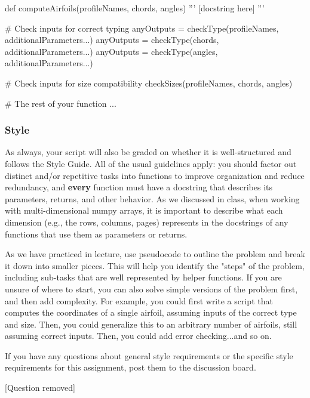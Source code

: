 \documentclass{homework}
\begin{document}
\begin{python}
def computeAirfoils(profileNames, chords, angles)
    '''
    [docstring here]
    '''

    # Check inputs for correct typing
    anyOutputs = checkType(profileNames, additionalParameters...)
    anyOutputs = checkType(chords, additionalParameters...)
    anyOutputs = checkType(angles, additionalParameters...)

    # Check inputs for size compatibility
    checkSizes(profileNames, chords, angles)

    # The rest of your function
    ...
\end{python}

\subsubsection*{Style}

As always, your script will also be graded on whether it is well-structured and follows the Style Guide. All of the usual guidelines apply: you should factor out distinct and/or repetitive tasks into functions to improve organization and reduce redundancy, and \textbf{every} function must have a docstring that describes its parameters, returns, and other behavior. As we discussed in class, when working with multi-dimensional numpy arrays, it is important to describe what each dimension (e.g., the rows, columns, pages) represents in the docstrings of any functions that use them as parameters or returns.

As we have practiced in lecture, use pseudocode to outline the problem and break it down into smaller pieces. This will help you identify the "steps" of the problem, including sub-tasks that are well represented by helper functions. If you are unsure of where to start, you can also solve simple versions of the problem first, and then add complexity. For example, you could first write a script that computes the coordinates of a single airfoil, assuming inputs of the correct type and size. Then, you could generalize this to an arbitrary number of airfoils, still assuming correct inputs. Then, you could add error checking...and so on.

If you have any questions about general style requirements or the specific style requirements for this assignment, post them to the discussion board.

\newpage
{}

[Question removed]
\end{document}

